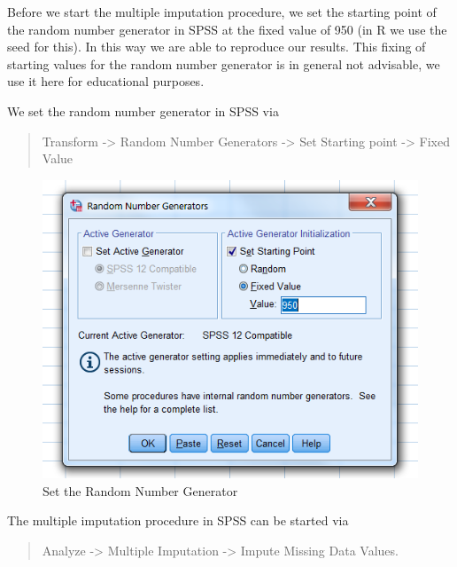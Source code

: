 \documentclass[]{book}
\theoremstyle{definition}
\theoremstyle{definition}
\theoremstyle{definition}
\theoremstyle{remark}
\begin{document}
Before we start the multiple imputation procedure, we set the starting
point of the random number generator in SPSS at the fixed value of 950
(in R we use the seed for this). In this way we are able to reproduce
our results. This fixing of starting values for the random number
generator is in general not advisable, we use it here for educational
purposes.

We set the random number generator in SPSS via

\begin{quote}
Transform -\textgreater{} Random Number Generators -\textgreater{} Set
Starting point -\textgreater{} Fixed Value
\end{quote}

\begin{figure}

{\centering \includegraphics[width=0.9\linewidth]{images/fig4.5} 

}

\caption{Set the Random Number Generator }\label{fig:fig4-5}
\end{figure}

The multiple imputation procedure in SPSS can be started via

\begin{quote}
Analyze -\textgreater{} Multiple Imputation -\textgreater{} Impute
Missing Data Values.
\end{quote}
\end{document}
